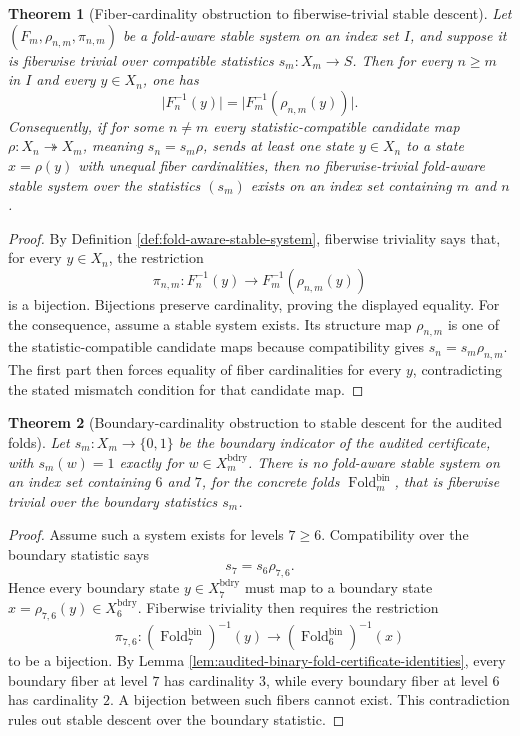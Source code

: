 \documentclass[12pt,a4paper]{article}
\theoremstyle{plain}
\newtheorem{theorem}{Theorem}[section]
\theoremstyle{definition}
\numberwithin{equation}{section}
\newcommand{\card}[1]{\lvert #1\rvert}
\newcommand{\Fold}{\operatorname{Fold}}
\begin{document}
\begin{theorem}[Fiber-cardinality obstruction to fiberwise-trivial stable descent]\label{thm:fiber-cardinality-obstruction-stable-descent}
Let \((F_m,\rho_{n,m},\pi_{n,m})\) be a fold-aware stable system on an index set \(I\), and suppose it is fiberwise trivial over compatible statistics \(s_m:X_m\to S\).  Then for every \(n\ge m\) in \(I\) and every \(y\in X_n\), one has
\[
\card{F_n^{-1}(y)}=
\card{F_m^{-1}(\rho_{n,m}(y))}.
\]
Consequently, if for some \(n\ne m\) every statistic-compatible candidate map \(\rho:X_n\twoheadrightarrow X_m\), meaning \(s_n=s_m\rho\), sends at least one state \(y\in X_n\) to a state \(x=\rho(y)\) with unequal fiber cardinalities, then no fiberwise-trivial fold-aware stable system over the statistics \((s_m)\) exists on an index set containing \(m\) and \(n\).
\end{theorem}

\begin{proof}
By Definition \ref{def:fold-aware-stable-system}, fiberwise triviality says that, for every \(y\in X_n\), the restriction
\[
\pi_{n,m}:F_n^{-1}(y)\longrightarrow F_m^{-1}(\rho_{n,m}(y))
\]
is a bijection.  Bijections preserve cardinality, proving the displayed equality.  For the consequence, assume a stable system exists.  Its structure map \(\rho_{n,m}\) is one of the statistic-compatible candidate maps because compatibility gives \(s_n=s_m\rho_{n,m}\).  The first part then forces equality of fiber cardinalities for every \(y\), contradicting the stated mismatch condition for that candidate map. \qedhere
\end{proof}


\begin{theorem}[Boundary-cardinality obstruction to stable descent for the audited folds]\label{thm:audited-folds-boundary-descent-obstruction}
Let \(s_m:X_m\to\{0,1\}\) be the boundary indicator of the audited certificate, with \(s_m(w)=1\) exactly for \(w\in X_m^{\mathrm{bdry}}\).  There is no fold-aware stable system on an index set containing \(6\) and \(7\), for the concrete folds \(\Fold_m^{\mathrm{bin}}\), that is fiberwise trivial over the boundary statistics \(s_m\).
\end{theorem}
\begin{proof}
Assume such a system exists for levels \(7\ge6\).  Compatibility over the boundary statistic says
\[
s_7=s_6\rho_{7,6}.
\]
Hence every boundary state \(y\in X_7^{\mathrm{bdry}}\) must map to a boundary state \(x=\rho_{7,6}(y)\in X_6^{\mathrm{bdry}}\).  Fiberwise triviality then requires the restriction
\[
\pi_{7,6}:(\Fold_7^{\mathrm{bin}})^{-1}(y)\longrightarrow
(\Fold_6^{\mathrm{bin}})^{-1}(x)
\]
to be a bijection.  By Lemma \ref{lem:audited-binary-fold-certificate-identities}, every boundary fiber at level \(7\) has cardinality \(3\), while every boundary fiber at level \(6\) has cardinality \(2\).  A bijection between such fibers cannot exist.  This contradiction rules out stable descent over the boundary statistic. \qedhere
\end{proof}
\end{document}
